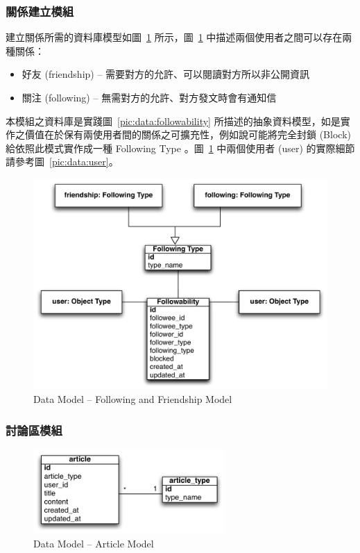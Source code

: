 \subsubsection{關係建立模組}
\label{sssec:following}
建立關係所需的資料庫模型如圖~\ref{pic:data:user2user} 所示，圖~\ref{pic:data:user2user} 中描述兩個使用者之間可以存在兩種關係：
\begin{itemize}
\item{好友 (friendship) -- 需要對方的允許、可以閱讀對方所以非公開資訊}
\item{關注 (following) -- 無需對方的允許、對方發文時會有通知信}
\end{itemize}
本模組之資料庫是實踐圖~\ref{pic:data:followability} 所描述的抽象資料模型，如是實作之價值在於保有兩使用者間的關係之可擴充性，例如說可能將完全封鎖 (Block) 給依照此模式實作成一種 Following Type 。圖~\ref{pic:data:user2user} 中兩個使用者 (user) 的實際細節請參考圖~\ref{pic:data:user}。

\begin{figure}[H]
\centering
\includegraphics[width=\textwidth]{img/user2user.pdf}
\caption{Data Model -- Following and Friendship Model}
\label{pic:data:user2user}
\end{figure}

\subsubsection{討論區模組}
\label{sssec:forum}

\begin{figure}[H]
\centering
\includegraphics[width=0.65\textwidth]{img/article.pdf}
\caption{Data Model -- Article Model}
\label{pic:data:article}
\end{figure}


